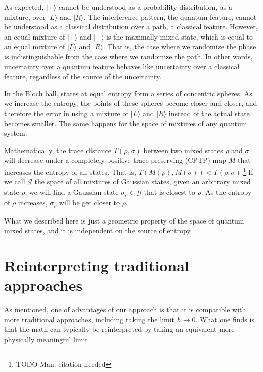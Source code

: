 \documentclass{article}
\def\>{\rangle}
\begin{document}
As expected, $|+\>$ cannot be understood as a probability distribution, as a mixture, over $|L\>$ and $|R\>$. The interference pattern, the quantum feature, cannot be understood as a classical distribution over a path, a classical feature. However, an equal mixture of $|+\>$ and $|-\>$ is the maximally mixed state, which is equal to an equal mixture of $|L\>$ and $|R\>$. That is, the case where we randomize the phase is indistinguishable from the case where we randomize the path. In other words, uncertainty over a quantum feature behaves like uncertainty over a classical feature, regardless of the source of the uncertainty.

In the Bloch ball, states at equal entropy form a series of concentric spheres. As we increase the entropy, the points of these spheres become closer and closer, and therefore the error in using a mixture of $|L\>$ and $|R\>$ instead of the actual state becomes smaller. The same happens for the space of mixtures of any quantum system.

Mathematically, the trace distance $T(\rho,\sigma)$ between two mixed states $\rho$ and $\sigma$ will decrease under a completely positive trace-preserving (CPTP) map $M$ that increases the entropy of all states. That is, $T(M(\rho),M(\sigma)) < T(\rho,\sigma)$.\footnote{TODO Man: citation needed} If we call $\mathcal{G}$ the space of all mixtures of Gaussian states, given an arbitrary mixed state $\rho$, we will find a Gaussian state $\sigma_{\rho} \in \mathcal{G}$ that is closest to $\rho$. As the entropy of $\rho$ increases, $\sigma_{\rho}$ will be get closer to $\rho$.

What we described here is just a geometric property of the space of quantum mixed states, and it is independent on the source of entropy.

\section{Reinterpreting traditional approaches}

As mentioned, one of advantages of our approach is that it is compatible with more traditional approaches, including taking the limit $\hbar \to 0$. What one finds is that the math can typically be reinterpreted by taking an equivalent more physically meaningful limit.
\end{document}
